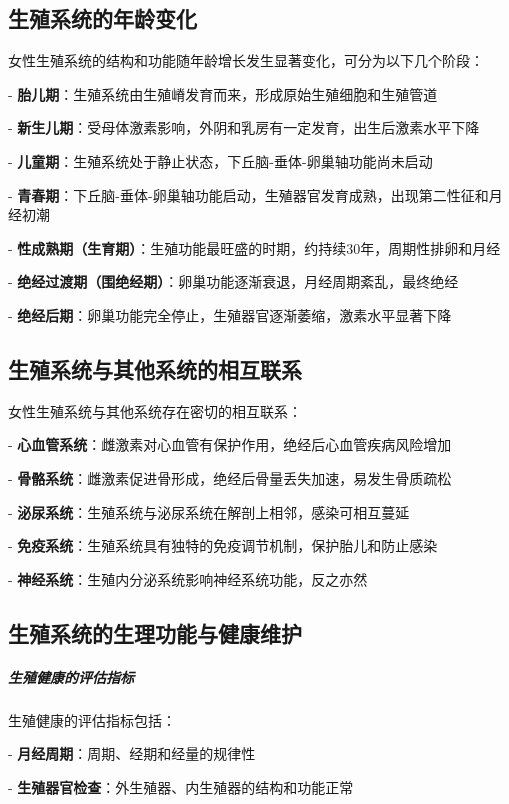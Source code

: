 \begin{enumerate}
\subsection{生殖系统的年龄变化}

女性生殖系统的结构和功能随年龄增长发生显著变化，可分为以下几个阶段：

- \textbf{胎儿期}：生殖系统由生殖嵴发育而来，形成原始生殖细胞和生殖管道

- \textbf{新生儿期}：受母体激素影响，外阴和乳房有一定发育，出生后激素水平下降

- \textbf{儿童期}：生殖系统处于静止状态，下丘脑-垂体-卵巢轴功能尚未启动

- \textbf{青春期}：下丘脑-垂体-卵巢轴功能启动，生殖器官发育成熟，出现第二性征和月经初潮

- \textbf{性成熟期（生育期）}：生殖功能最旺盛的时期，约持续30年，周期性排卵和月经

- \textbf{绝经过渡期（围绝经期）}：卵巢功能逐渐衰退，月经周期紊乱，最终绝经

- \textbf{绝经后期}：卵巢功能完全停止，生殖器官逐渐萎缩，激素水平显著下降

\subsection{生殖系统与其他系统的相互联系}

女性生殖系统与其他系统存在密切的相互联系：

- \textbf{心血管系统}：雌激素对心血管有保护作用，绝经后心血管疾病风险增加

- \textbf{骨骼系统}：雌激素促进骨形成，绝经后骨量丢失加速，易发生骨质疏松

- \textbf{泌尿系统}：生殖系统与泌尿系统在解剖上相邻，感染可相互蔓延

- \textbf{免疫系统}：生殖系统具有独特的免疫调节机制，保护胎儿和防止感染

- \textbf{神经系统}：生殖内分泌系统影响神经系统功能，反之亦然

\subsection{生殖系统的生理功能与健康维护}

\subparagraph{生殖健康的评估指标}

生殖健康的评估指标包括：

- \textbf{月经周期}：周期、经期和经量的规律性

- \textbf{生殖器官检查}：外生殖器、内生殖器的结构和功能正常


\end{enumerate}
